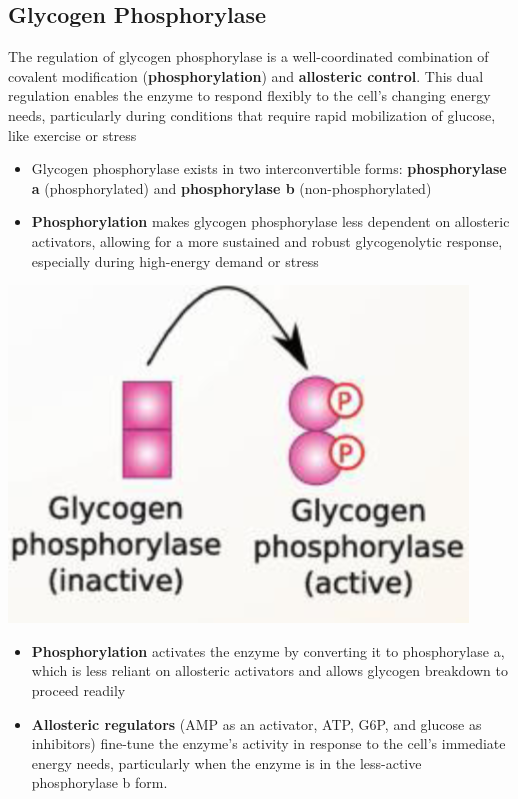\documentclass[10pt]{article}
\begin{document}
\subsection*{Glycogen Phosphorylase}
The regulation of glycogen phosphorylase is a well-coordinated combination of covalent modification (\textbf{phosphorylation}) and \textbf{allosteric control}.  This dual regulation enables the enzyme to respond flexibly to the cell's changing energy needs, particularly during conditions that require rapid mobilization of glucose, like exercise or stress
\begin{itemize}
	\item Glycogen phosphorylase exists in two interconvertible forms: \textbf{phosphorylase a} (phosphorylated) and \textbf{phosphorylase b} (non-phosphorylated)
	\item \textbf{Phosphorylation} makes glycogen phosphorylase less dependent on allosteric activators, allowing for a more sustained and robust glycogenolytic response, especially during high-energy demand or stress
\end{itemize}
\begin{center} 
	\includegraphics*[scale=0.6]{L1_18.png}
\end{center}

\begin{itemize}
	\item \textbf{Phosphorylation} activates the enzyme by converting it to phosphorylase a, which is less reliant on allosteric activators and allows glycogen breakdown to proceed readily
	\item \textbf{Allosteric regulators} (AMP as an activator, ATP, G6P, and glucose as inhibitors) fine-tune the enzyme's activity in response to the cell's immediate energy needs, particularly when the enzyme is in the less-active phosphorylase b form.
\end{itemize}
\end{document}
